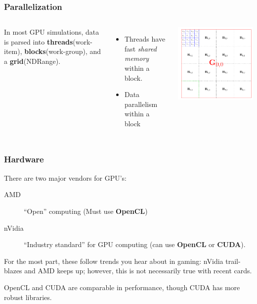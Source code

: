 \documentclass{beamer}
\begin{document}
\begin{frame}
\frametitle{Parallelization}
\begin{columns}
In most GPU simulations, data is parsed into \textbf{threads}(work-item), \textbf{blocks}(work-group), and a \textbf{grid}(NDRange).
\begin{itemize}
\item Threads have fast \textit{shared memory} within a block.
\item Data parallelism within a block
\end{itemize} 
\begin{center}
\includegraphics[width=\textwidth]{GBT.png}
\end{center}
\end{columns}
\end{frame}

\begin{frame}
\frametitle{Hardware}
There are two major vendors for GPU's: 
\begin{description}
\item[AMD] ``Open'' computing (Must use \textbf{OpenCL})
\item[nVidia] ``Industry standard'' for GPU computing (can use \textbf{OpenCL} or \textbf{CUDA}). 
\end{description}

For the most part, these follow trends you hear about in gaming: nVidia trail-blazes and AMD keeps up; however, this is not necessarily true with recent cards.

\vspace{0.5cm}

OpenCL and CUDA are comparable in performance, though CUDA has more robust libraries.
\end{frame}
\end{document}
